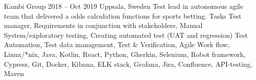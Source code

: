 \documentclass{sobCV}[2015/09/08]
\begin{document}
   

   {Kambi Group}
   {2018 -- Oct 2019}
   {Uppsala, Sweden}{
       Test lead in autonomous agile team that delivered a odds calculation
       functions for sports betting.
   }
    {Tasks}{
       Test manager,
       Requirements in conjunction with stakeholders,
       Manual System/exploratory testing,
       Creating automated test (UAT and regression)
 }{  %
 }{
       Test Automation,
       Test data management,
       Test \& Verification,
       Agile Work flow, 
       Linux/*nix, 
       Java, 
       Kotlin, 
       React, 
       Python, 
       Gherkin, 
       Selenium, 
       Robot framework,
       Cypress, 
       Git, 
       Docker, 
       Kibana, 
       ELK stack, 
       Grafana, 
       Jira, 
       Confluence, 
       API-testing, 
       Maven 
}
\end{document}
